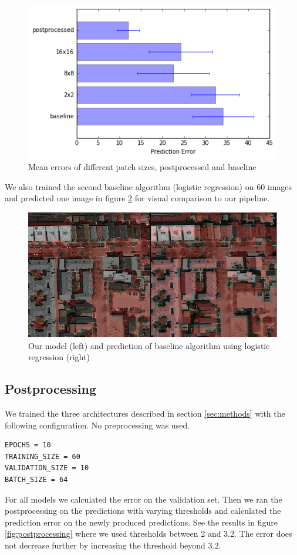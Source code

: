 \documentclass[10pt,conference,compsocconf]{IEEEtran}
\begin{document}
\begin{figure}
	\centering
	\includegraphics[width=.8\columnwidth]{pictures/baseline}
	\caption{Mean errors of different patch sizes, postprocessed and baseline}
	\label{fig:baseline}
\end{figure}

We also trained the second baseline algorithm (logistic regression) on 60 images  and predicted one image in figure \ref{fig:scikit} for visual comparison to our pipeline.

\begin{figure}
	\includegraphics[width=\columnwidth]{pictures/baseline1-comp}
	\caption{Our model (left) and prediction of baseline algorithm using logistic regression (right)}
	\label{fig:scikit}
\end{figure}

\subsection{Postprocessing}
We trained the three architectures described in section \ref{sec:methods} with the following configuration. No preprocessing was used.
\begin{lstlisting}
EPOCHS = 10
TRAINING_SIZE = 60
VALIDATION_SIZE = 10
BATCH_SIZE = 64
\end{lstlisting}
For all models we calculated the error on the validation set. Then we ran the postprocessing on the predictions with varying thresholds and calculated the prediction error on the newly produced predictions. See the results in figure \ref{fig:postprocessing} where we used thresholds between 2 and 3.2. The error does not decrease further by increasing the threshold beyond 3.2.
\end{document}
